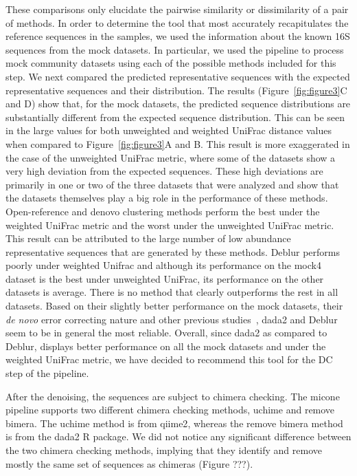   These comparisons only elucidate the pairwise similarity or dissimilarity of a pair of methods.
  In order to determine the tool that most accurately recapitulates the reference sequences in the samples, we used the information about the known 16S sequences from the mock datasets.
  In particular, we used the pipeline to process mock community datasets using each of the possible methods included for this step.
  We next compared the predicted representative sequences with the expected representative sequences and their distribution.
  The results (Figure~\ref{fig:figure3}C and D) show that, for the mock datasets, the predicted sequence distributions are substantially different from the expected sequence distribution.
  This can be seen in the large values for both unweighted and weighted UniFrac distance values when compared to Figure~\ref{fig:figure3}A and B.
  This result is more exaggerated in the case of the unweighted UniFrac metric, where some of the datasets show a very high deviation from the expected sequences.
  These high deviations are primarily in one or two of the three datasets that were analyzed and show that the datasets themselves play a big role in the performance of these methods.
  Open-reference and denovo clustering methods perform the best under the weighted UniFrac metric and the worst under the unweighted UniFrac metric.
  This result can be attributed to the large number of low abundance representative sequences that are generated by these methods.
  Deblur performs poorly under weighted Unifrac and although its performance on the mock4 dataset is the best under unweighted UniFrac, its performance on the other datasets is average.
  There is no method that clearly outperforms the rest in all datasets.
  Based on their slightly better performance on the mock datasets, their \textit{de novo} error correcting nature and other previous studies~\cite{Nearing2018}, \ac{dada2} and Deblur seem to be in general the most reliable.
  Overall, since \ac{dada2} as compared to Deblur, displays better performance on all the mock datasets and under the weighted UniFrac metric, we have decided to recommend this tool for the DC step of the pipeline.

  After the denoising, the sequences are subject to chimera checking.
  The \ac{micone} pipeline supports two different chimera checking methods, uchime and remove bimera.
  The uchime method is from \ac{qiime2}, whereas the remove bimera method is from the \ac{dada2} R package.
  We did not notice any significant difference between the two chimera checking methods, implying that they identify and remove mostly the same set of sequences as chimeras (Figure ???).

